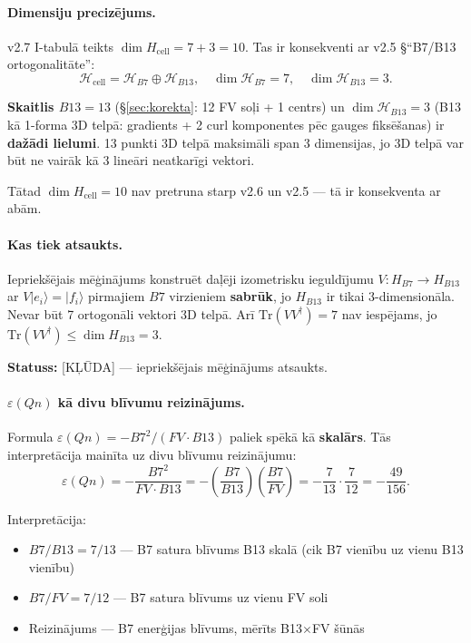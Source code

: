 \documentclass[12pt,a4paper]{article}
\begin{document}
\paragraph{Dimensiju precizējums.}
v2.7 I-tabulā teikts $\dim H_{\text{cell}} = 7 + 3 = 10$. Tas ir konsekventi ar v2.5 \S ``B7/B13 ortogonalitāte'':
\[
\mathcal{H}_{\text{cell}} = \mathcal{H}_{B7} \oplus \mathcal{H}_{B13}, \quad
\dim \mathcal{H}_{B7} = 7, \quad \dim \mathcal{H}_{B13} = 3.
\]

\textbf{Skaitlis $B13 = 13$} (\S\ref{sec:korekta}: 12 FV soļi + 1 centrs) un \textbf{$\dim \mathcal{H}_{B13} = 3$} (B13 kā 1-forma 3D telpā: gradients + 2 curl komponentes pēc gauges fiksēšanas) ir \textbf{dažādi lielumi}. 13 punkti 3D telpā maksimāli span 3 dimensijas, jo 3D telpā var būt ne vairāk kā 3 lineāri neatkarīgi vektori.

Tātad $\dim H_{\text{cell}} = 10$ nav pretruna starp v2.6 un v2.5 — tā ir konsekventa ar abām.

\paragraph{Kas tiek atsaukts.}
Iepriekšējais mēģinājums konstruēt daļēji izometrisku ieguldījumu $V: H_{B7} \to H_{B13}$ ar $V|e_i\rangle = |f_i\rangle$ pirmajiem $B7$ virzieniem \textbf{sabrūk}, jo $H_{B13}$ ir tikai 3-dimensionāla. Nevar būt 7 ortogonāli vektori 3D telpā. Arī $\text{Tr}(VV^\dagger) = 7$ nav iespējams, jo $\text{Tr}(VV^\dagger) \leq \dim H_{B13} = 3$.

\textbf{Statuss:} [KĻŪDA] — iepriekšējais mēģinājums atsaukts.

\paragraph{$\varepsilon(Qn)$ kā divu blīvumu reizinājums.}
Formula $\varepsilon(Qn) = -B7^2/(FV \cdot B13)$ paliek spēkā kā \textbf{skalārs}. Tās interpretācija mainīta uz divu blīvumu reizinājumu:
\[
\varepsilon(Qn) = -\frac{B7^2}{FV \cdot B13}
= -\left(\frac{B7}{B13}\right)\left(\frac{B7}{FV}\right)
= -\frac{7}{13} \cdot \frac{7}{12} = -\frac{49}{156}.
\]

Interpretācija:
\begin{itemize}
    \item $B7/B13 = 7/13$ — B7 satura blīvums B13 skalā (cik B7 vienību uz vienu B13 vienību)
    \item $B7/FV = 7/12$ — B7 satura blīvums uz vienu FV soli
    \item Reizinājums — B7 enerģijas blīvums, mērīts B13$\times$FV šūnās
\end{itemize}
\end{document}
